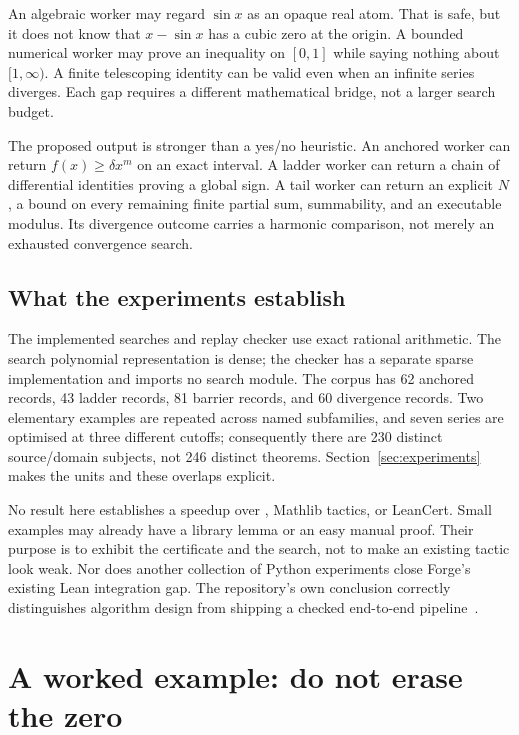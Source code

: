 \documentclass[11pt,a4paper]{article}
\theoremstyle{definition}\newtheorem{definition}[theorem]{Definition}
\newcommand{\code}[1]{\texttt{\detokenize{#1}}}
\begin{document}
An algebraic worker may regard $\sin x$ as an opaque real atom. That is safe,
but it does not know that $x-\sin x$ has a cubic zero at the origin. A bounded
numerical worker may prove an inequality on $[0,1]$ while saying nothing about
$[1,\infty)$. A finite telescoping identity can be valid even when an infinite
series diverges. Each gap requires a different mathematical bridge, not a
larger search budget.

The proposed output is stronger than a yes/no heuristic. An anchored worker can
return $f(x)\ge\delta x^m$ on an exact interval. A ladder worker can return a
chain of differential identities proving a global sign. A tail worker can return
an explicit $N$, a bound on every remaining finite partial sum, summability,
and an executable modulus. Its divergence outcome carries a harmonic comparison,
not merely an exhausted convergence search.

\subsection{What the experiments establish}

The implemented searches and replay checker use exact rational arithmetic. The
search polynomial representation is dense; the checker has a separate sparse
implementation and imports no search module. The corpus has 62 anchored records,
43 ladder records, 81 barrier records, and 60 divergence records. Two elementary
examples are repeated across named subfamilies, and seven series are optimised
at three different cutoffs; consequently there are 230 distinct source/domain
subjects, not 246 distinct theorems. Section~\ref{sec:experiments} makes the units
and these overlaps explicit.

No result here establishes a speedup over \code{grind}, Mathlib tactics, or
LeanCert. Small examples may already have a library lemma or an easy manual
proof. Their purpose is to exhibit the certificate and the search, not to make
an existing tactic look weak. Nor does another collection of Python experiments
close Forge's existing Lean integration gap. The repository's own conclusion
correctly distinguishes algorithm design from shipping a checked end-to-end
pipeline~\cite{forge-conclusion}.

\section{A worked example: do not erase the zero}
\label{sec:example}
\end{document}
